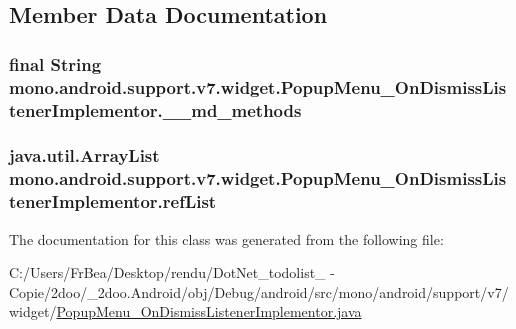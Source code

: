 \subsection{Member Data Documentation}
\hypertarget{classmono_1_1android_1_1support_1_1v7_1_1widget_1_1_popup_menu___on_dismiss_listener_implementor_cfbe85e634b5066ac1cdc76d4d5a81c5}{
\subsubsection[{\_\-\_\-md\_\-methods}]{\setlength{\rightskip}{0pt plus 5cm}final String {\bf mono.android.support.v7.widget.PopupMenu\_\-OnDismissListenerImplementor.\_\-\_\-md\_\-methods}}}
\label{classmono_1_1android_1_1support_1_1v7_1_1widget_1_1_popup_menu___on_dismiss_listener_implementor_cfbe85e634b5066ac1cdc76d4d5a81c5}


\hypertarget{classmono_1_1android_1_1support_1_1v7_1_1widget_1_1_popup_menu___on_dismiss_listener_implementor_a8589501d990d4181a1ce3a3a26e4c5d}{
\subsubsection[{refList}]{\setlength{\rightskip}{0pt plus 5cm}java.util.ArrayList {\bf mono.android.support.v7.widget.PopupMenu\_\-OnDismissListenerImplementor.refList}}}
\label{classmono_1_1android_1_1support_1_1v7_1_1widget_1_1_popup_menu___on_dismiss_listener_implementor_a8589501d990d4181a1ce3a3a26e4c5d}




The documentation for this class was generated from the following file:\begin{CompactItemize}
\item 
C:/Users/FrBea/Desktop/rendu/DotNet\_\-todolist\_ - Copie/2doo/\_\-2doo.Android/obj/Debug/android/src/mono/android/support/v7/widget/\hyperlink{_popup_menu___on_dismiss_listener_implementor_8java}{PopupMenu\_\-OnDismissListenerImplementor.java}\end{CompactItemize}
